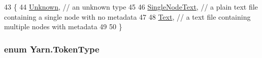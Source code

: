 \begin{DoxyCode}
43     \{
44         \hyperlink{a00050_ad7ebb46e7309ead8767383a672b3272fa88183b946cc5f0e8c96b2e66e1c74a7e}{Unknown}, \textcolor{comment}{// an unknown type}
45 
46         \hyperlink{a00050_ad7ebb46e7309ead8767383a672b3272faceeb33da53902872b63956f8df786cd8}{SingleNodeText}, \textcolor{comment}{// a plain text file containing a single node with no metadata}
47 
48         \hyperlink{a00050_a301aa7c866593a5b625a8fc158bbeacea9dffbf69ffba8bc38bc4e01abf4b1675}{Text}, \textcolor{comment}{//  a text file containing multiple nodes with metadata}
49 
50     \}
\end{DoxyCode}
\hypertarget{a00050_a301aa7c866593a5b625a8fc158bbeace}{
\subsubsection[{Token\-Type}]{\setlength{\rightskip}{0pt plus 5cm}enum {\bf Yarn.\-Token\-Type}\hspace{0.3cm}{\ttfamily [package]}}}\label{a00050_a301aa7c866593a5b625a8fc158bbeace}

